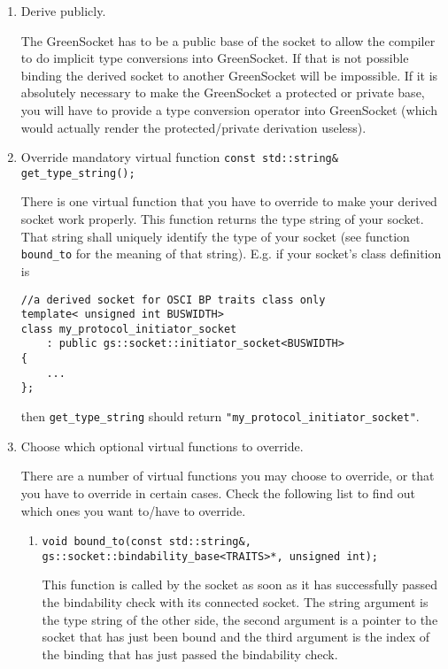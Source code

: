 \documentclass[a4paper,10pt]{article}          %
\begin{document}
\begin{enumerate}
\item 
Derive publicly.

The GreenSocket has to be a public base of the socket to allow the compiler to do implicit type conversions into GreenSocket. If that is not possible binding the derived socket to another GreenSocket will be impossible. If it is absolutely necessary to make the GreenSocket a protected or private base, you will have to provide a type conversion operator into GreenSocket (which would actually render the protected/private derivation useless).

\item
Override mandatory virtual function \verb|const std::string& get_type_string();|

There is one virtual function that you have to override to make your derived socket work properly. This function returns the type string of your socket. That string shall uniquely identify the type of your socket (see function \verb|bound_to| for the meaning of that string). E.g. if your socket's class definition is

\begin{small}
\begin{verbatim}
//a derived socket for OSCI BP traits class only
template< unsigned int BUSWIDTH>
class my_protocol_initiator_socket
	: public gs::socket::initiator_socket<BUSWIDTH>
{
	...
};
\end{verbatim}
\end{small}

then \verb|get_type_string| should return \verb|"my_protocol_initiator_socket"|.

\item
Choose which optional virtual functions to override.

There are a number of virtual functions you may choose to override, or that you have to override in certain cases. Check the following list to find out which ones you want to/have to override.


\begin{enumerate}
\item 
\verb|void bound_to(const std::string&, gs::socket::bindability_base<TRAITS>*, unsigned int);|

This function is called by the socket as soon as it has successfully passed the bindability check with its connected socket. The string argument is the type string of the other side, the second argument is a pointer to the socket that has just been bound and the third argument is the index of the binding that has just passed the bindability check.


\end{enumerate}
\end{enumerate}
\end{document}

